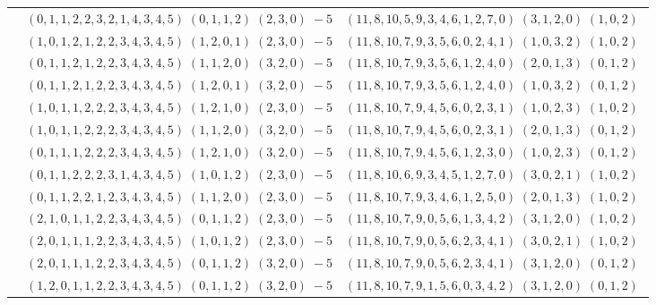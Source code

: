 \documentclass[11pt]{article}
\begin{document}
\begin{longtable}[l]{|c|c|c|}
 \cline{2-3} 
 & $(0 ,1 ,1 ,2 ,2 ,3 ,2 ,1 ,4 ,3 ,4 ,5) \;(0 ,1 ,1 ,2) \;(2 ,3 ,0) \;-5$ & $(11 ,8 ,10 ,5 ,9 ,3 ,4 ,6 ,1 ,2 ,7 ,0) \;(3 ,1 ,2 ,0) \;(1 ,0 ,2) \;$\\ 
 \cline{2-3} 
 & $(1 ,0 ,1 ,2 ,1 ,2 ,2 ,3 ,4 ,3 ,4 ,5) \;(1 ,2 ,0 ,1) \;(2 ,3 ,0) \;-5$ & $(11 ,8 ,10 ,7 ,9 ,3 ,5 ,6 ,0 ,2 ,4 ,1) \;(1 ,0 ,3 ,2) \;(1 ,0 ,2) \;$\\ 
 \cline{2-3} 
 & $(0 ,1 ,1 ,2 ,1 ,2 ,2 ,3 ,4 ,3 ,4 ,5) \;(1 ,1 ,2 ,0) \;(3 ,2 ,0) \;-5$ & $(11 ,8 ,10 ,7 ,9 ,3 ,5 ,6 ,1 ,2 ,4 ,0) \;(2 ,0 ,1 ,3) \;(0 ,1 ,2) \;$\\ 
 \cline{2-3} 
 & $(0 ,1 ,1 ,2 ,1 ,2 ,2 ,3 ,4 ,3 ,4 ,5) \;(1 ,2 ,0 ,1) \;(3 ,2 ,0) \;-5$ & $(11 ,8 ,10 ,7 ,9 ,3 ,5 ,6 ,1 ,2 ,4 ,0) \;(1 ,0 ,3 ,2) \;(0 ,1 ,2) \;$\\ 
 \cline{2-3} 
 & $(1 ,0 ,1 ,1 ,2 ,2 ,2 ,3 ,4 ,3 ,4 ,5) \;(1 ,2 ,1 ,0) \;(2 ,3 ,0) \;-5$ & $(11 ,8 ,10 ,7 ,9 ,4 ,5 ,6 ,0 ,2 ,3 ,1) \;(1 ,0 ,2 ,3) \;(1 ,0 ,2) \;$\\ 
 \cline{2-3} 
 & $(1 ,0 ,1 ,1 ,2 ,2 ,2 ,3 ,4 ,3 ,4 ,5) \;(1 ,1 ,2 ,0) \;(3 ,2 ,0) \;-5$ & $(11 ,8 ,10 ,7 ,9 ,4 ,5 ,6 ,0 ,2 ,3 ,1) \;(2 ,0 ,1 ,3) \;(0 ,1 ,2) \;$\\ 
 \cline{2-3} 
 & $(0 ,1 ,1 ,1 ,2 ,2 ,2 ,3 ,4 ,3 ,4 ,5) \;(1 ,2 ,1 ,0) \;(3 ,2 ,0) \;-5$ & $(11 ,8 ,10 ,7 ,9 ,4 ,5 ,6 ,1 ,2 ,3 ,0) \;(1 ,0 ,2 ,3) \;(0 ,1 ,2) \;$\\ 
 \cline{2-3} 
 & $(0 ,1 ,1 ,2 ,2 ,2 ,3 ,1 ,4 ,3 ,4 ,5) \;(1 ,0 ,1 ,2) \;(2 ,3 ,0) \;-5$ & $(11 ,8 ,10 ,6 ,9 ,3 ,4 ,5 ,1 ,2 ,7 ,0) \;(3 ,0 ,2 ,1) \;(1 ,0 ,2) \;$\\ 
 \cline{2-3} 
 & $(0 ,1 ,1 ,2 ,2 ,1 ,2 ,3 ,4 ,3 ,4 ,5) \;(1 ,1 ,2 ,0) \;(2 ,3 ,0) \;-5$ & $(11 ,8 ,10 ,7 ,9 ,3 ,4 ,6 ,1 ,2 ,5 ,0) \;(2 ,0 ,1 ,3) \;(1 ,0 ,2) \;$\\ 
 \cline{2-3} 
 & $(2 ,1 ,0 ,1 ,1 ,2 ,2 ,3 ,4 ,3 ,4 ,5) \;(0 ,1 ,1 ,2) \;(2 ,3 ,0) \;-5$ & $(11 ,8 ,10 ,7 ,9 ,0 ,5 ,6 ,1 ,3 ,4 ,2) \;(3 ,1 ,2 ,0) \;(1 ,0 ,2) \;$\\ 
 \cline{2-3} 
 & $(2 ,0 ,1 ,1 ,1 ,2 ,2 ,3 ,4 ,3 ,4 ,5) \;(1 ,0 ,1 ,2) \;(2 ,3 ,0) \;-5$ & $(11 ,8 ,10 ,7 ,9 ,0 ,5 ,6 ,2 ,3 ,4 ,1) \;(3 ,0 ,2 ,1) \;(1 ,0 ,2) \;$\\ 
 \cline{2-3} 
 & $(2 ,0 ,1 ,1 ,1 ,2 ,2 ,3 ,4 ,3 ,4 ,5) \;(0 ,1 ,1 ,2) \;(3 ,2 ,0) \;-5$ & $(11 ,8 ,10 ,7 ,9 ,0 ,5 ,6 ,2 ,3 ,4 ,1) \;(3 ,1 ,2 ,0) \;(0 ,1 ,2) \;$\\ 
 \cline{2-3} 
 & $(1 ,2 ,0 ,1 ,1 ,2 ,2 ,3 ,4 ,3 ,4 ,5) \;(0 ,1 ,1 ,2) \;(3 ,2 ,0) \;-5$ & $(11 ,8 ,10 ,7 ,9 ,1 ,5 ,6 ,0 ,3 ,4 ,2) \;(3 ,1 ,2 ,0) \;(0 ,1 ,2) \;$\\ 

\end{longtable}
\end{document}
